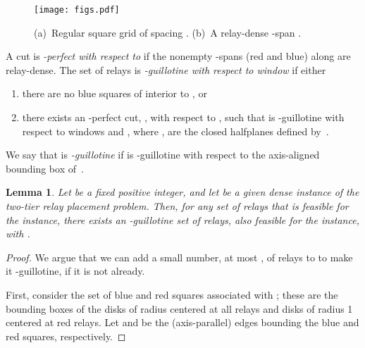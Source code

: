 \documentclass[11pt,a4paper]{article}
\newtheorem{lemma}{Lemma}
\theoremstyle{definition}
\theoremstyle{remark}
\begin{document}
\begin{enumerate}
\begin{figure}\centering
\texttt{[image: figs.pdf]}
\caption{(a)~Regular square grid  of spacing . (b)~A relay-dense -span .}\label{fig:densebridge}
\end{figure}

A cut  is {\em -perfect with respect to } if
the nonempty -spans (red and blue) along  are relay-dense.
The set  of relays is {\em -guillotine
  with respect to window } if either
\begin{enumerate}
    \item there are no blue squares of  interior to , or
    \item there exists an -perfect cut, , with respect to
      , such that  is -guillotine with respect to windows
       and , where ,  are the closed
      halfplanes defined by~.
\end{enumerate}
We say that  is {\em -guillotine} if  is -guillotine with
respect to the axis-aligned bounding box of~.

\begin{lemma}\label{lem_guillotine_relays}
Let  be a fixed positive integer, and let  be a given dense
instance of the two-tier relay placement problem.  Then, for any set
 of relays that is feasible for the instance, there exists an
-guillotine set  of relays, also feasible for the instance, with
.
\end{lemma}

\begin{proof}
We argue that we can add a small number, at most ,
of relays to  to make it -guillotine, if it is not already.

First, consider the set of blue and red squares associated with ;
these are the bounding boxes of the disks of radius  centered at
all relays and disks of radius 1 centered at red relays.  Let 
and  be the (axis-parallel) edges bounding the blue and red
squares, respectively.


\end{proof}
\end{enumerate}
\end{document}
